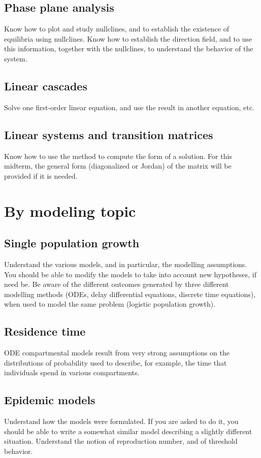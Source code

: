 \documentclass[12pt]{article}
\begin{document}
\subsection*{Phase plane analysis}
Know how to plot and study nullclines, and to establish the existence of equilibria using nullclines. Know how to establish the direction field, and to use this information, together with the nullclines, to understand the behavior of the system.

\subsection*{Linear cascades}
Solve one first-order linear equation, and use the result in another equation, etc.


\subsection*{Linear systems and transition matrices}
Know how to use the method to compute the form of a solution. For this midterm, the general form (diagonalized or Jordan) of the matrix will be provided if it is needed.


\section*{By modeling topic}

\subsection*{Single population growth}
Understand the various models, and in particular, the modelling assumptions. You should be able to modify the models to take into account new hypotheses, if need be. Be aware of the different outcomes generated by three different modelling methods (ODEs, delay differential equations, discrete time equations), when used to model the same problem (logistic population growth).


\subsection*{Residence time}
ODE compartmental models result from very strong assumptions on the distributions of probability used to describe, for example, the time that individuals spend in various compartments.


\subsection*{Epidemic models}
Understand how the models were formulated. If you are asked to do it, you should be able to write a somewhat similar model describing a slightly different situation. Understand the notion of reproduction number, and of threshold behavior.
\end{document}
